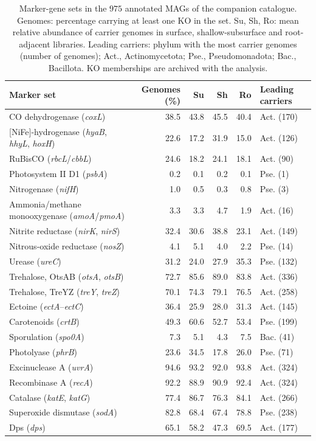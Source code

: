 \begin{table}[htbp]
\centering\scriptsize
\caption{Marker-gene sets in the $975$ annotated MAGs of the companion
catalogue. Genomes: percentage carrying at least one KO in the set. Su, Sh, Ro:
mean relative abundance of carrier genomes in surface, shallow-subsurface and root-adjacent libraries. Leading carriers:
phylum with the most carrier genomes (number of genomes); Act., Actinomycetota;
Pse., Pseudomonadota; Bac., Bacillota. KO memberships are archived with the
analysis.}
\label{tab:traits_genomes}
\begin{tabular}{P{4.2cm}rrrrl}
\toprule
Marker set & Genomes (\%) & Su & Sh & Ro & Leading carriers \\
\midrule
CO dehydrogenase (\textit{coxL}) & 38.5 & 43.8 & 45.5 & 40.4 & Act. (170) \\
{[NiFe]}-hydrogenase (\textit{hyaB}, \textit{hhyL}, \textit{hoxH}) & 22.6 & 17.2 & 31.9 & 15.0 & Act. (126) \\
RuBisCO (\textit{rbcL}/\textit{cbbL}) & 24.6 & 18.2 & 24.1 & 18.1 & Act. (90) \\
Photosystem II D1 (\textit{psbA}) & 0.2 & 0.1 & 0.2 & 0.1 & Pse. (1) \\
Nitrogenase (\textit{nifH}) & 1.0 & 0.5 & 0.3 & 0.8 & Pse. (3) \\
Ammonia/methane monooxygenase (\textit{amoA}/\textit{pmoA}) & 3.3 & 3.3 & 4.7 & 1.9 & Act. (16) \\
Nitrite reductase (\textit{nirK}, \textit{nirS}) & 32.4 & 30.6 & 38.8 & 23.1 & Act. (149) \\
Nitrous-oxide reductase (\textit{nosZ}) & 4.1 & 5.1 & 4.0 & 2.2 & Pse. (14) \\
Urease (\textit{ureC}) & 31.2 & 24.0 & 27.9 & 35.3 & Pse. (132) \\
Trehalose, OtsAB (\textit{otsA}, \textit{otsB}) & 72.7 & 85.6 & 89.0 & 83.8 & Act. (336) \\
Trehalose, TreYZ (\textit{treY}, \textit{treZ}) & 70.1 & 74.3 & 79.1 & 76.5 & Act. (258) \\
Ectoine (\textit{ectA}--\textit{ectC}) & 36.4 & 25.9 & 28.0 & 31.3 & Act. (145) \\
Carotenoids (\textit{crtB}) & 49.3 & 60.6 & 52.7 & 53.4 & Pse. (199) \\
Sporulation (\textit{spo0A}) & 7.3 & 5.1 & 4.3 & 7.5 & Bac. (41) \\
Photolyase (\textit{phrB}) & 23.6 & 34.5 & 17.8 & 26.0 & Pse. (71) \\
Excinuclease A (\textit{uvrA}) & 94.6 & 93.2 & 92.0 & 93.8 & Act. (324) \\
Recombinase A (\textit{recA}) & 92.2 & 88.9 & 90.9 & 92.4 & Act. (324) \\
Catalase (\textit{katE}, \textit{katG}) & 77.4 & 86.7 & 76.3 & 84.1 & Act. (266) \\
Superoxide dismutase (\textit{sodA}) & 82.8 & 68.4 & 67.4 & 78.8 & Pse. (238) \\
Dps (\textit{dps}) & 65.1 & 58.2 & 47.3 & 69.5 & Act. (177) \\
\bottomrule
\end{tabular}
\end{table}

